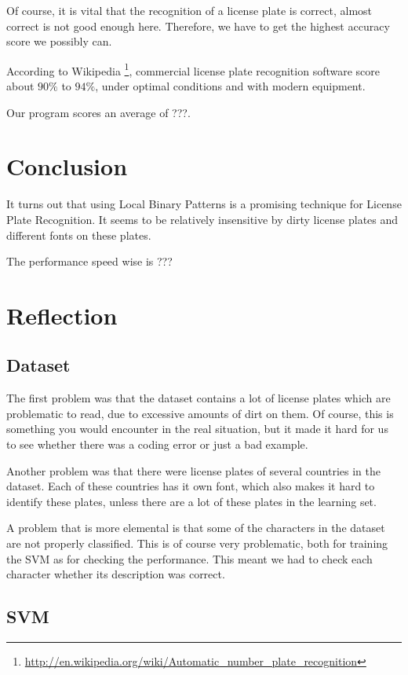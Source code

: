 \documentclass[a4paper]{article}
\begin{document}
Of course, it is vital that the recognition of a license plate is correct,
almost correct is not good enough here. Therefore, we have to get the highest
accuracy score we possibly can.

According to Wikipedia \footnote{
\url{http://en.wikipedia.org/wiki/Automatic_number_plate_recognition}},
commercial license plate recognition software score about $90\%$ to $94\%$,
under optimal conditions and with modern equipment.

Our program scores an average of ???.


\section{Conclusion}

It turns out that using Local Binary Patterns is a promising technique for
License Plate Recognition. It seems to be relatively insensitive by dirty
license plates and different fonts on these plates.

The performance speed wise is ???


\section{Reflection}


\subsection{Dataset}

The first problem was that the dataset contains a lot of license plates which
are problematic to read, due to excessive amounts of dirt on them. Of course,
this is something you would encounter in the real situation, but it made it hard
for us to see whether there was a coding error or just a bad example.

Another problem was that there were license plates of several countries in the
dataset. Each of these countries has it own font, which also makes it hard to
identify these plates, unless there are a lot of these plates in the learning
set.

A problem that is more elemental is that some of the characters in the dataset
are not properly classified. This is of course very problematic, both for
training the SVM as for checking the performance. This meant we had to check
each character whether its description was correct.


\subsection{SVM}
\end{document}
